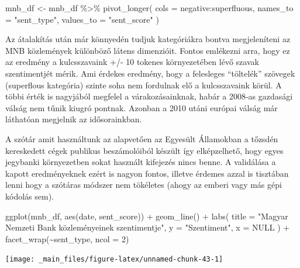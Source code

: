 \documentclass[
]{book}
\newenvironment{Shaded}{\begin{snugshade}}{\end{snugshade}}
\newcommand{\AttributeTok}[1]{\textcolor[rgb]{0.77,0.63,0.00}{#1}}
\newcommand{\ConstantTok}[1]{\textcolor[rgb]{0.00,0.00,0.00}{#1}}
\newcommand{\DecValTok}[1]{\textcolor[rgb]{0.00,0.00,0.81}{#1}}
\newcommand{\FunctionTok}[1]{\textcolor[rgb]{0.00,0.00,0.00}{#1}}
\newcommand{\NormalTok}[1]{#1}
\newcommand{\OtherTok}[1]{\textcolor[rgb]{0.56,0.35,0.01}{#1}}
\newcommand{\SpecialCharTok}[1]{\textcolor[rgb]{0.00,0.00,0.00}{#1}}
\newcommand{\StringTok}[1]{\textcolor[rgb]{0.31,0.60,0.02}{#1}}
\begin{document}
\begin{Shaded}
\begin{Highlighting}[]
\NormalTok{mnb\_df }\OtherTok{\textless{}{-}}\NormalTok{ mnb\_df }\SpecialCharTok{\%\textgreater{}\%}
  \FunctionTok{pivot\_longer}\NormalTok{(}
    \AttributeTok{cols =}\NormalTok{ negative}\SpecialCharTok{:}\NormalTok{superfluous,}
    \AttributeTok{names\_to =} \StringTok{"sent\_type"}\NormalTok{,}
    \AttributeTok{values\_to =} \StringTok{"sent\_score"}
\NormalTok{  )}
\end{Highlighting}
\end{Shaded}

Az átalakítás után már könnyedén tudjuk kategóriákra bontva
megjeleníteni az MNB közlemények különböző látens dimenzióit. Fontos
emlékezni arra, hogy ez az eredmény a kulcsszavaink +/- 10 tokenes
környezetében lévő szavak szentimentjét mérik. Ami érdekes eredmény,
hogy a felesleges ``töltelék'' szövegek (superflous kategória) szinte
soha nem fordulnak elő a kulcsszavaink körül. A többi érték is nagyjából
megfelel a várakozásainknak, habár a 2008-as gazdasági válság nem tűnik
kiugró pontnak. Azonban a 2010 utáni európai válság már láthatóan
megjelnik az idősorainkban.

A szótár amit használtunk az alapvetően az Egyesült Államokban a tőzsdén
kereskedett cégek publikus beszámolóiból készült így elképzelhető, hogy
egyes jegybanki környezetben sokat használt kifejezés nincs benne. A
validálása a kapott eredményeknek ezért is nagyon fontos, illetve
érdemes azzal is tisztában lenni hogy a szótáras módszer nem tökéletes
(ahogy az emberi vagy más gépi kódolás sem).

\begin{Shaded}
\begin{Highlighting}[]
\FunctionTok{ggplot}\NormalTok{(mnb\_df, }\FunctionTok{aes}\NormalTok{(date, sent\_score)) }\SpecialCharTok{+}
  \FunctionTok{geom\_line}\NormalTok{() }\SpecialCharTok{+}
  \FunctionTok{labs}\NormalTok{(}
    \AttributeTok{title =} \StringTok{"Magyar Nemzeti Bank közleményeinek szentimentje"}\NormalTok{,}
    \AttributeTok{y =} \StringTok{"Szentiment"}\NormalTok{,}
    \AttributeTok{x =} \ConstantTok{NULL}
\NormalTok{  ) }\SpecialCharTok{+}
  \FunctionTok{facet\_wrap}\NormalTok{(}\SpecialCharTok{\textasciitilde{}}\NormalTok{sent\_type, }\AttributeTok{ncol =} \DecValTok{2}\NormalTok{)}
\end{Highlighting}
\end{Shaded}

\begin{center}\texttt{[image: \_main\_files/figure-latex/unnamed-chunk-43-1]} \end{center}
\end{document}
